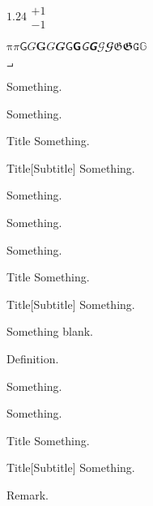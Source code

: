 \documentclass[a4paper]{article}
\begin{document}
$1.24 \substack{+1 \\ -1}$

$\mathup{π}π\mathsf{G}G 	𝐆 	𝐺 	𝑮 	𝖦 	𝗚 	𝘎 	𝙂 	𝒢 	𝓖 	𝔊 	𝕲 	𝙶 	𝔾$

$\intprod$

\begin{thm}
Something.
\end{thm}

\begin{thm}[Subtitle]
Something.
\end{thm}

\begin{namedthm}{Title}
Something.
\end{namedthm}

\begin{namedthm}{Title}[Subtitle]
Something.
\end{namedthm}

\begin{unamedthm}
Something.
\end{unamedthm}

\begin{defn}
Something.
\end{defn}

\begin{defn}[Subtitle]
Something.
\end{defn}

\begin{nameddef}{Title}
Something.
\end{nameddef}

\begin{nameddef}{Title}[Subtitle]
Something.
\end{nameddef}

\begin{nameddef}{ }
Something blank.
\end{nameddef}

\begin{unameddef}
Definition.
\end{unameddef}

\begin{rem}
Something.
\end{rem}

\begin{rem}[Subtitle]
Something.
\end{rem}

\begin{namedrem}{Title}
Something.
\end{namedrem}

\begin{namedrem}{Title}[Subtitle]
Something.
\end{namedrem}

\begin{unamedrem}
Remark.
\end{unamedrem}
\end{document}
